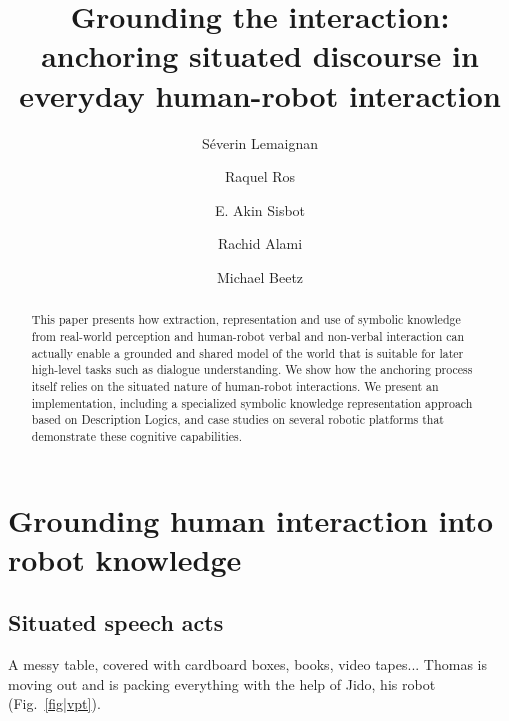 \documentclass[twocolumn]{svjour3}
\begin{document}

\title{Grounding the interaction: anchoring situated discourse in everyday human-robot interaction}

\author{
S\'everin Lemaignan \and
Raquel Ros \and
E. Akin Sisbot \and
Rachid Alami \and
Michael Beetz
}


\maketitle

\begin{abstract}
This paper presents how extraction, representation and use of symbolic
knowledge from real-world perception and human-robot verbal and non-verbal
interaction can actually enable a grounded and shared model of the world that
is suitable for later high-level tasks such as dialogue understanding. We show how
the anchoring process itself relies on the situated nature of human-robot
interactions. We present an implementation, including a specialized symbolic
knowledge representation approach based on Description Logics, and case studies
on several robotic platforms that demonstrate these cognitive capabilities.
\end{abstract}

\section{Grounding human interaction into robot knowledge}

\subsection{Situated speech acts}
\label{intro_example}

A messy table, covered with cardboard boxes, books, video tapes... Thomas is
moving out and is packing everything with the help of Jido, his robot
(Fig.~\ref{fig|vpt}).
\end{document}
